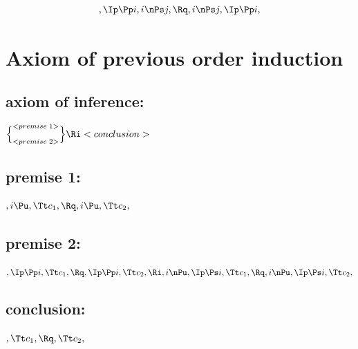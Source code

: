 \[,\Ip \Pp i, i \nPs j, \Rq , i \nPs j, \Ip \Pp i,\]






\bigskip
\bigskip
\bigskip
\bigskip
\section{Axiom of previous order induction}
\subsection{axiom of inference:}
\begin{math}
\Bigl\{ ^{<premise \; 1>}_{<premise \;  2>}\Bigl\} \Ri <conclusion>
\end{math}
\bigskip
\bigskip
\subsection{premise 1:}
\begin{math}
, i \Pu, \Tt c_1, \Rq , i \Pu, \Tt c_2,
\end{math}
\bigskip
\bigskip
\subsection{premise 2:}
\begin{math}
, \Ip \Pp i, \Tt c_1 , \Rq , \Ip \Pp i, \Tt c_2 , \Ri \\\\
,i \nPu, \Ip \Ps i, \Tt c_1, \Rq , i \nPu, \Ip \Ps i, \Tt c_2,
\end{math}
\bigskip
\bigskip
\subsection{conclusion:}
\begin{math}
, \Tt c_1, \Rq , \Tt c_2,
\end{math}



\newpage